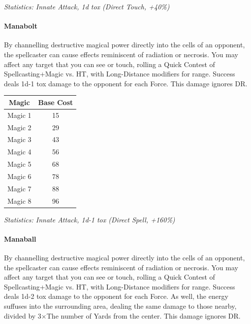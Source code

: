\begin{multicols*}{3}
	\textcolor{OliveGreen}{\textit{Statistics: Innate Attack, 1d tox (Direct Touch, +40\%)}}
	
	\paragraph{Manabolt}
	
	By channelling destructive magical power directly into the cells of an opponent, the spellcaster can cause effects reminiscent of radiation or necrosis. You may affect any target that you can see or touch, rolling a Quick Contest of Spellcasting+Magic vs. HT, with Long-Distance modifiers for range. Success deals 1d-1 tox damage to the opponent for each Force. This damage ignores DR.
	
	\begin{center}
		\begin{tabular}{|c|c|}
			\hline
			Magic & Base Cost \\
			\hline
			\hline
			Magic 1 & 15 \\
			Magic 2 & 29 \\
			Magic 3 & 43 \\
			Magic 4 & 56 \\
			Magic 5 & 68 \\
			Magic 6 & 78 \\
			Magic 7 & 88 \\
			Magic 8 & 96 \\
			\hline
		\end{tabular}
	\end{center}
	
	\textcolor{OliveGreen}{\textit{Statistics: Innate Attack, 1d-1 tox (Direct Spell, +160\%)}}
	
	\paragraph{Manaball}
	
	By channelling destructive magical power directly into the cells of an opponent, the spellcaster can cause effects reminiscent of radiation or necrosis. You may affect any target that you can see or touch, rolling a Quick Contest of Spellcasting+Magic vs. HT, with Long-Distance modifiers for range. Success deals 1d-2 tox damage to the opponent for each Force. As well, the energy suffuses into the surrounding area, dealing the same damage to those nearby, divided by 3\(\times\)The number of Yards from the center. This damage ignores DR. 
	

\end{multicols*}
